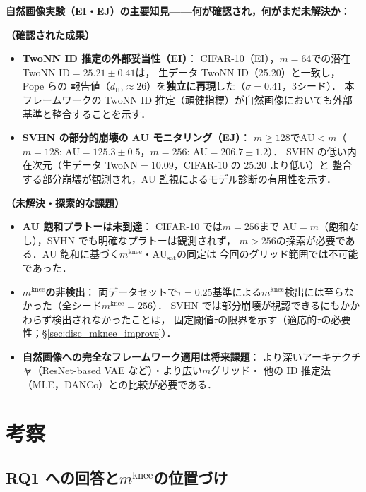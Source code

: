 \documentclass[11pt,a4paper]{jsarticle}
\newcommand{\AUsat}{\mathrm{AU}_{\mathrm{sat}}}
\newcommand{\mknee}{m^{\mathrm{knee}}}
\begin{document}
\textbf{自然画像実験（EI・EJ）の主要知見——何が確認され，何がまだ未解決か}：

\textbf{（確認された成果）}
\begin{itemize}
  \item \textbf{TwoNN ID 推定の外部妥当性（EI）}：
        CIFAR-10（EI），$m=64$での潜在 TwoNN ID$=25.21\pm0.41$は，
        生データ TwoNN ID（25.20）と一致し，Pope ら\cite{pope2021intrinsic}の
        報告値（$d_\mathrm{ID} \approx 26$）を\textbf{独立に再現}した（$\sigma=0.41$，3シード）．
        本フレームワークの TwoNN ID 推定（頑健指標）が自然画像においても外部基準と整合することを示す．
  \item \textbf{SVHN の部分的崩壊の AU モニタリング（EJ）}：
        $m \geq 128$でAU$< m$（$m=128$: AU$=125.3\pm0.5$，$m=256$: AU$=206.7\pm1.2$）．
        SVHN の低い内在次元（生データ TwoNN$=10.09$，CIFAR-10 の 25.20 より低い）と
        整合する部分崩壊が観測され，AU 監視によるモデル診断の有用性を示す．
\end{itemize}

\textbf{（未解決・探索的な課題）}
\begin{itemize}
  \item \textbf{AU 飽和プラトーは未到達}：
        CIFAR-10 では$m=256$まで AU$=m$（飽和なし），SVHN でも明確なプラトーは観測されず，
        $m > 256$の探索が必要である．AU 飽和に基づく$\mknee$・$\AUsat$の同定は
        今回のグリッド範囲では不可能であった．
  \item \textbf{$\mknee$の非検出}：
        両データセットで$\tau = 0.25$基準による$\mknee$検出には至らなかった（全シード$\mknee=256$）．
        SVHN では部分崩壊が視認できるにもかかわらず検出されなかったことは，
        固定閾値$\tau$の限界を示す（適応的$\tau$の必要性；§\ref{sec:disc_mknee_improve}）．
  \item \textbf{自然画像への完全なフレームワーク適用は将来課題}：
        より深いアーキテクチャ（ResNet-based VAE など）・より広い$m$グリッド・
        他の ID 推定法（MLE，DANCo）との比較が必要である．
\end{itemize}

\section{考察}\label{sec:discussion}

\subsection{RQ1 への回答と$\mknee$の位置づけ}\label{sec:disc_mknee}
\end{document}

